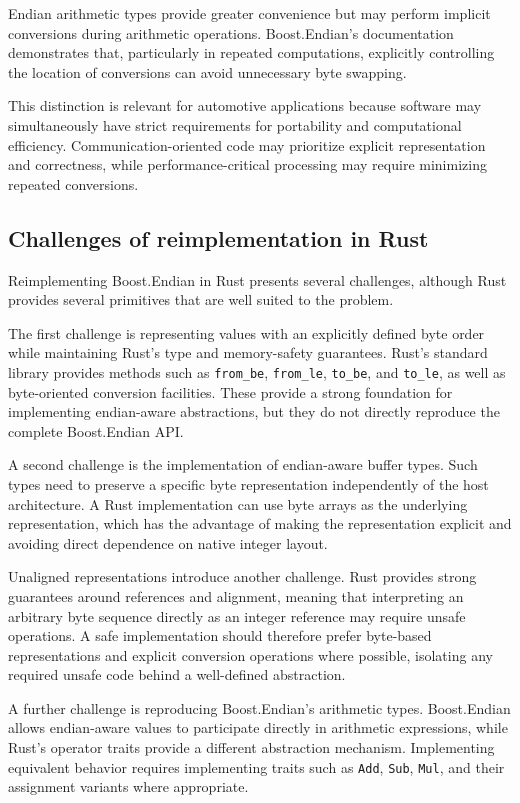 Endian arithmetic types provide greater convenience but may perform implicit conversions during arithmetic operations. 
Boost.Endian's documentation demonstrates that, particularly in repeated computations, 
explicitly controlling the location of conversions can avoid unnecessary byte swapping.

This distinction is relevant for automotive applications because software may simultaneously have strict requirements for 
portability and computational efficiency. Communication-oriented code may prioritize explicit representation and correctness, 
while performance-critical processing may require minimizing repeated conversions.

\subsection{Challenges of reimplementation in Rust}

Reimplementing Boost.Endian in Rust presents several challenges, although Rust provides several primitives that are well suited to the problem.

The first challenge is representing values with an explicitly defined byte order while maintaining Rust's type 
and memory-safety guarantees. 
Rust's standard library provides methods such as \texttt{from\_be}, \texttt{from\_le}, \texttt{to\_be}, and \texttt{to\_le}, 
as well as byte-oriented conversion facilities. These provide a strong foundation for implementing endian-aware abstractions, 
but they do not directly reproduce the complete Boost.Endian API.

A second challenge is the implementation of endian-aware buffer types. 
Such types need to preserve a specific byte representation independently of the host architecture. 
A Rust implementation can use byte arrays as the underlying representation, which has the advantage of 
making the representation explicit and avoiding direct dependence on native integer layout.

Unaligned representations introduce another challenge. Rust provides strong guarantees around references and alignment, 
meaning that interpreting an arbitrary byte sequence directly as an integer reference may require unsafe operations. 
A safe implementation should therefore prefer byte-based representations and explicit conversion operations where possible, 
isolating any required unsafe code behind a well-defined abstraction.

A further challenge is reproducing Boost.Endian's arithmetic types. Boost.Endian allows endian-aware values to 
participate directly in arithmetic expressions, while Rust's operator traits provide a different abstraction mechanism. 
Implementing equivalent behavior requires implementing traits such as \texttt{Add}, \texttt{Sub}, \texttt{Mul}, 
and their assignment variants where appropriate.

